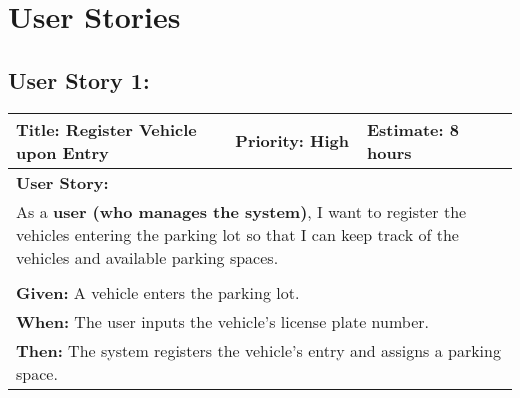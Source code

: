 \section{User Stories}

\subsection{User Story 1:}
\begin{table}[H]
    \centering
    \begin{tabular}{|p{}|p{}|p{}|}
        \hline
        \rowcolor{lightblue}
        \textbf{Title: Register Vehicle upon Entry} & \textbf{Priority: High} & \textbf{Estimate: 8 hours} \\
        \hline
        \multicolumn{3}{|l|}{\textbf{User Story:}} \\
        \multicolumn{3}{|p{15cm}|}{As a \textbf{user (who manages the system)}, I want to register the vehicles entering the parking lot so that I can keep track of the vehicles and available parking spaces.} \\
        \hline
        \rowcolor{lightblue}
        \multicolumn{3}{|c|}{\textbf{Acceptance Criteria:}} \\
        \hline
        \multicolumn{3}{|l|}{\textbf{Given:} A vehicle enters the parking lot.} \\
        \multicolumn{3}{|l|}{\textbf{When:} The user inputs the vehicle's license plate number.} \\
        \multicolumn{3}{|l|}{\textbf{Then:} The system registers the vehicle's entry and assigns a parking space.} \\
        \hline
    \end{tabular}
\end{table}

